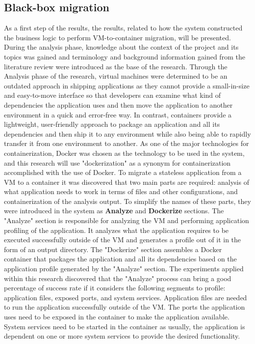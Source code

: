 \documentclass[twocolumn]{article}
\begin{document}
\subsection{Black-box migration}
As a first step of the results, the results, related to how the system constructed the business logic to perform VM-to-container migration, will be presented. During the analysis phase, knowledge about the context of the project and its topics was gained and terminology and background information gained from the literature review were introduced as the base of the research. Through the Analysis phase of the research, virtual machines were determined to be an outdated approach in shipping applications as they cannot provide a small-in-size and easy-to-move interface so that developers can examine what kind of dependencies the application uses and then move the application to another environment in a quick and error-free way. In contrast, containers provide a lightweight, user-friendly approach to package an application and all its dependencies and then ship it to any environment while also being able to rapidly transfer it from one environment to another. As one of the major technologies for containerization, Docker was chosen as the technology to be used in the system, and this research will use "dockerization" as a synonym for containerization accomplished with the use of Docker. To migrate a stateless application from a VM to a container it was discovered that two main parts are required: analysis of what application needs to work in terms of files and other configurations, and containerization of the analysis output. To simplify the names of these parts, they were introduced in the system as \textbf{Analyze} and \textbf{Dockerize} sections. The "Analyze" section is responsible for analyzing the VM and performing application profiling of the application. It analyzes what the application requires to be executed successfully outside of the VM and generates a profile out of it in the form of an output directory. The "Dockerize" section assembles a Docker container that packages the application and all its dependencies based on the application profile generated by the "Analyze" section. The experiments applied within this research discovered that the "Analyze" process can bring a good percentage of success rate if it considers the following segments to profile: application files, exposed ports, and system services. Application files are needed to run the application successfully outside of the VM. The ports the application uses need to be exposed in the container to make the application available. System services need to be started in the container as usually, the application is dependent on one or more system services to provide the desired functionality.
\end{document}
